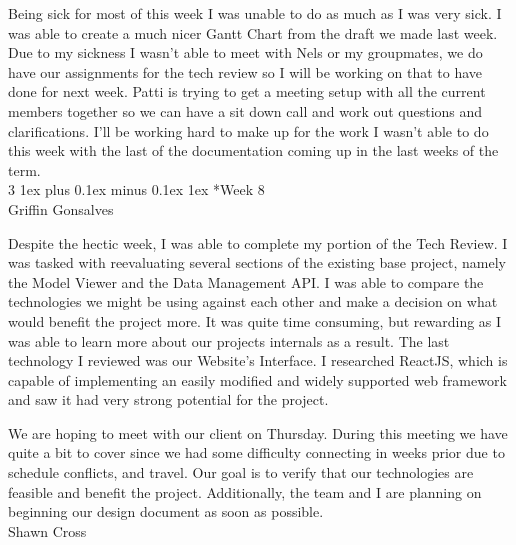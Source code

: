 \documentclass[letterpaper, 10pt, draftclsnofoot, compsoc, onecolumn]{IEEEtran}
\makeatletter
\def\subsubsection{\@startsection{subsubsection}%
                                 {3}%
                                 {\z@}%
                                 {1ex plus 0.1ex minus 0.1ex}%
                                 {1ex}%
                                 {\normalfont\normalsize}}%
\makeatother
\begin{document}
Being sick for most of this week I was unable to do as much as I was very sick. I was able to create a much nicer Gantt Chart from the draft we made last week. Due to my sickness I wasn't able to meet with Nels or my groupmates, we do have our assignments for the tech review so I will be working on that to have done for next week. Patti is trying to get a meeting setup with all the current members together so we can have a sit down call and work out questions and clarifications. I'll be working hard to make up for the work I wasn't able to do this week with the last of the documentation coming up in the last weeks of the term.\\

\subsubsection*{Week 8}\hspace*{\fill} \\
Griffin Gonsalves

Despite the hectic week, I was able to complete my portion of the Tech Review. I was tasked with reevaluating several sections of the existing base project, namely the Model Viewer and the Data Management API. I was able to compare the technologies we might be using against each other and make a decision on what would benefit the project more. It was quite time consuming, but rewarding as I was able to learn more about our projects internals as a result. The last technology I reviewed was our Website's Interface. I researched ReactJS, which is capable of implementing an easily modified and widely supported web framework and saw it had very strong potential for the project.

We are hoping to meet with our client on Thursday. During this meeting we have quite a bit to cover since we had some difficulty connecting in weeks prior due to schedule conflicts, and travel. Our goal is to verify that our technologies are feasible and benefit the project. Additionally, the team and I are planning on beginning our design document as soon as possible.\\

Shawn Cross
\end{document}
